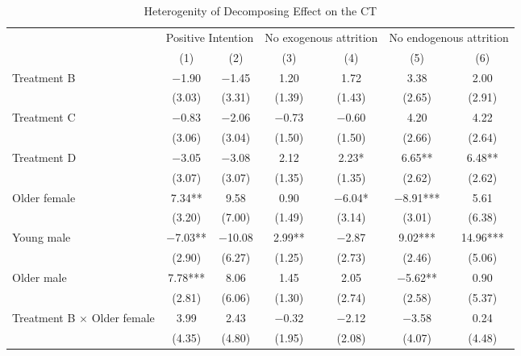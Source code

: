 \documentclass[12pt, a4paper]{article}
\begin{document}
\begin{table}[H]

\caption{\label{tab:test-decompose-interaction-reg}Heterogenity of Decomposing Effect on the CT}
\centering
\fontsize{8}{10}\selectfont
\begin{threeparttable}
\begin{tabular}[t]{lcccccc}
\toprule
\multicolumn{1}{c}{ } & \multicolumn{2}{c}{Positive Intention} & \multicolumn{2}{c}{No exogenous attrition} & \multicolumn{2}{c}{No endogenous attrition} \\
\cmidrule(l{3pt}r{3pt}){2-3} \cmidrule(l{3pt}r{3pt}){4-5} \cmidrule(l{3pt}r{3pt}){6-7}
  & (1) & (2) & (3) & (4) & (5) & (6)\\
\midrule
Treatment B & \num{-1.90} & \num{-1.45} & \num{1.20} & \num{1.72} & \num{3.38} & \num{2.00}\\
 & (\num{3.03}) & (\num{3.31}) & (\num{1.39}) & (\num{1.43}) & (\num{2.65}) & (\num{2.91})\\
Treatment C & \num{-0.83} & \num{-2.06} & \num{-0.73} & \num{-0.60} & \num{4.20} & \num{4.22}\\
 & (\num{3.06}) & (\num{3.04}) & (\num{1.50}) & (\num{1.50}) & (\num{2.66}) & (\num{2.64})\\
Treatment D & \num{-3.05} & \num{-3.08} & \num{2.12} & \num{2.23}* & \num{6.65}** & \num{6.48}**\\
 & (\num{3.07}) & (\num{3.07}) & (\num{1.35}) & (\num{1.35}) & (\num{2.62}) & (\num{2.62})\\
Older female & \num{7.34}** & \num{9.58} & \num{0.90} & \num{-6.04}* & \num{-8.91}*** & \num{5.61}\\
 & (\num{3.20}) & (\num{7.00}) & (\num{1.49}) & (\num{3.14}) & (\num{3.01}) & (\num{6.38})\\
Young male & \num{-7.03}** & \num{-10.08} & \num{2.99}** & \num{-2.87} & \num{9.02}*** & \num{14.96}***\\
 & (\num{2.90}) & (\num{6.27}) & (\num{1.25}) & (\num{2.73}) & (\num{2.46}) & (\num{5.06})\\
Older male & \num{7.78}*** & \num{8.06} & \num{1.45} & \num{2.05} & \num{-5.62}** & \num{0.90}\\
 & (\num{2.81}) & (\num{6.06}) & (\num{1.30}) & (\num{2.74}) & (\num{2.58}) & (\num{5.37})\\
Treatment B $\times$ Older female & \num{3.99} & \num{2.43} & \num{-0.32} & \num{-2.12} & \num{-3.58} & \num{0.24}\\
 & (\num{4.35}) & (\num{4.80}) & (\num{1.95}) & (\num{2.08}) & (\num{4.07}) & (\num{4.48})\\

\end{tabular}
\end{threeparttable}
\end{table}
\end{document}
